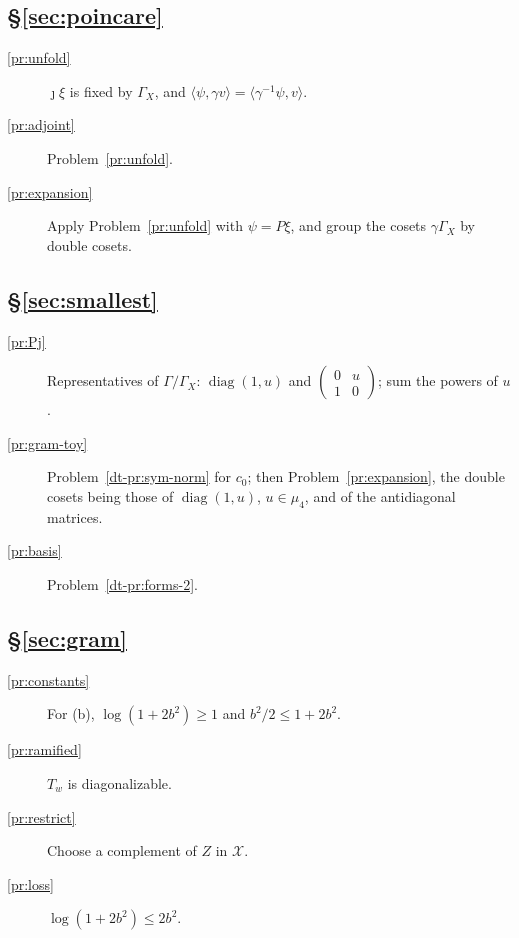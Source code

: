 \documentclass[reqno]{amsart}
\theoremstyle{definition}
\theoremstyle{plain}
\theoremstyle{remark}
\newcommand{\Xc}{\mathcal X}
\newcommand{\diag}{\operatorname{diag}}
\begin{document}
\subsection*{\S\ref{sec:poincare}}
\begin{description}
\item[\ref{pr:unfold}] \(\jmath\xi\) is fixed by \(\Gamma_X\), and \(\langle\psi,\gamma v\rangle=\langle\gamma^{-1}\psi,v\rangle\).
\item[\ref{pr:adjoint}] Problem~\ref{pr:unfold}.
\item[\ref{pr:expansion}] Apply Problem~\ref{pr:unfold} with \(\psi=P\xi\), and group the cosets \(\gamma\Gamma_X\) by double cosets.
\end{description}

\subsection*{\S\ref{sec:smallest}}
\begin{description}
\item[\ref{pr:Pj}] Representatives of \(\Gamma/\Gamma_X\): \(\diag(1,u)\) and \(\begin{pmatrix}0&u\\1&0\end{pmatrix}\); sum the powers of \(u\).
\item[\ref{pr:gram-toy}] Problem~\ref{dt-pr:sym-norm} for \(c_0\); then Problem~\ref{pr:expansion}, the double cosets being those of \(\diag(1,u)\), \(u\in\mu_4\), and of the antidiagonal matrices.
\item[\ref{pr:basis}] Problem~\ref{dt-pr:forms-2}.
\end{description}

\subsection*{\S\ref{sec:gram}}
\begin{description}
\item[\ref{pr:constants}] For (b), \(\log(1+2b^2)\ge1\) and \(b^2/2\le1+2b^2\).
\item[\ref{pr:ramified}] \(T_w\) is diagonalizable.
\item[\ref{pr:restrict}] Choose a complement of \(Z\) in \(\Xc\).
\item[\ref{pr:loss}] \(\log(1+2b^2)\le2b^2\).
\end{description}
\end{document}
